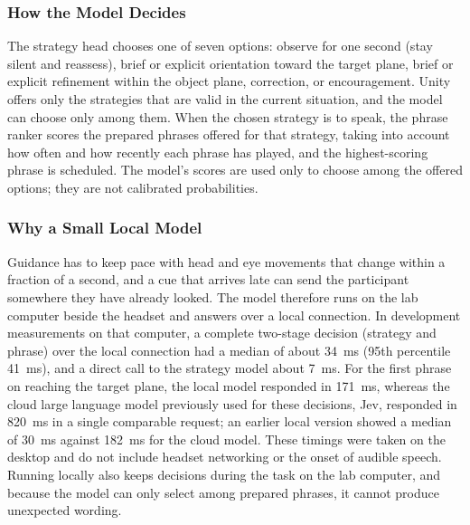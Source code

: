 \subsubsection{How the Model Decides}
The strategy head chooses one of seven options: observe for one second (stay silent and reassess), brief or explicit orientation toward the target plane, brief or explicit refinement within the object plane, correction, or encouragement. Unity offers only the strategies that are valid in the current situation, and the model can choose only among them. When the chosen strategy is to speak, the phrase ranker scores the prepared phrases offered for that strategy, taking into account how often and how recently each phrase has played, and the highest-scoring phrase is scheduled. The model's scores are used only to choose among the offered options; they are not calibrated probabilities.

\subsubsection{Why a Small Local Model}
\label{sec:small-local-model}
Guidance has to keep pace with head and eye movements that change within a fraction of a second, and a cue that arrives late can send the participant somewhere they have already looked. The model therefore runs on the lab computer beside the headset and answers over a local connection. In development measurements on that computer, a complete two-stage decision (strategy and phrase) over the local connection had a median of about 34~ms (95th percentile 41~ms), and a direct call to the strategy model about 7~ms. For the first phrase on reaching the target plane, the local model responded in 171~ms, whereas the cloud large language model previously used for these decisions, Jev, responded in 820~ms in a single comparable request; an earlier local version showed a median of 30~ms against 182~ms for the cloud model. These timings were taken on the desktop and do not include headset networking or the onset of audible speech. Running locally also keeps decisions during the task on the lab computer, and because the model can only select among prepared phrases, it cannot produce unexpected wording.

